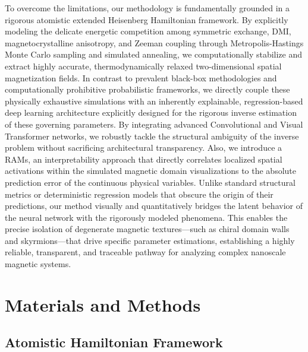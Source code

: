 \documentclass[a4paper,fleqn]{cas-sc}
\begin{document}
To overcome the limitations, our methodology is fundamentally grounded in a rigorous atomistic extended Heisenberg Hamiltonian framework. By explicitly modeling the delicate energetic competition among symmetric exchange, DMI, magnetocrystalline anisotropy, and Zeeman coupling through Metropolis-Hastings Monte Carlo sampling and simulated annealing, we computationally stabilize and extract highly accurate, thermodynamically relaxed two-dimensional spatial magnetization fields. In contrast to prevalent black-box methodologies and computationally prohibitive probabilistic frameworks, we directly couple these physically exhaustive simulations with an inherently explainable, regression-based deep learning architecture explicitly designed for the rigorous inverse estimation of these governing parameters. By integrating advanced Convolutional and Visual Transformer networks, we robustly tackle the structural ambiguity of the inverse problem without sacrificing architectural transparency. Also, we introduce a RAMs, an interpretability approach that directly correlates localized spatial activations within the simulated magnetic domain visualizations to the absolute prediction error of the continuous physical variables. Unlike standard structural metrics or deterministic regression models that obscure the origin of their predictions, our method visually and quantitatively bridges the latent behavior of the neural network with the rigorously modeled phenomena. This enables the precise isolation of degenerate magnetic textures—such as chiral domain walls and skyrmions—that drive specific parameter estimations, establishing a highly reliable, transparent, and traceable pathway for analyzing complex nanoscale magnetic systems.



\section{Materials and Methods}\label{sec:materials}

\subsection{Atomistic Hamiltonian Framework}\label{sec:hamiltonian}
\end{document}
